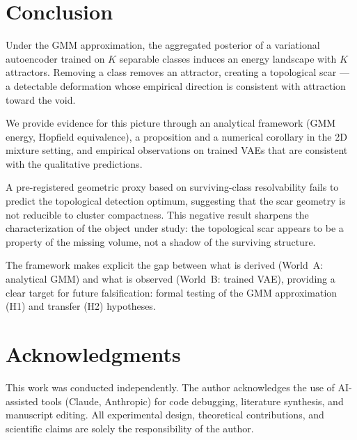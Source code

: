 \documentclass[11pt]{article}
\begin{document}
\section{Conclusion}
\label{sec:conclusion}

Under the GMM approximation, the aggregated posterior of a variational
autoencoder trained on $K$ separable classes induces an energy landscape
with $K$ attractors.
Removing a class removes an attractor, creating a topological scar ---
a detectable deformation whose empirical direction is consistent with
attraction toward the void.

We provide evidence for this picture through an analytical framework
(GMM energy, Hopfield equivalence), a proposition and a numerical corollary
in the 2D mixture setting, and empirical observations on trained VAEs that
are consistent with the qualitative predictions.

A pre-registered geometric proxy based on surviving-class resolvability
fails to predict the topological detection optimum, suggesting that the
scar geometry is not reducible to cluster compactness.
This negative result sharpens the characterization of the object under
study: the topological scar appears to be a property of the missing volume,
not a shadow of the surviving structure.

The framework makes explicit the gap between what is derived (World~A:
analytical GMM) and what is observed (World~B: trained VAE), providing
a clear target for future falsification: formal testing of the GMM
approximation (H1) and transfer (H2) hypotheses.


\section*{Acknowledgments}
This work was conducted independently. The author acknowledges
the use of AI-assisted tools (Claude, Anthropic) for code debugging,
literature synthesis, and manuscript editing. All experimental design,
theoretical contributions, and scientific claims are solely
the responsibility of the author.






\appendix
\end{document}
